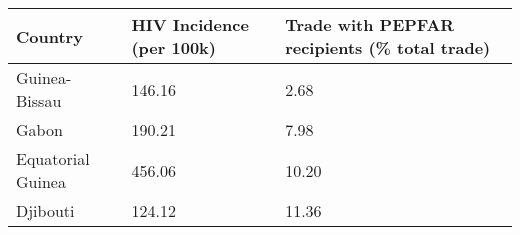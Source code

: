 \begin{table}
\centering
\begin{tabular}[t]{lll}
\toprule
Country & HIV Incidence (per 100k) & Trade with PEPFAR recipients (\% total trade)\\
\midrule
Guinea-Bissau & 146.16 & 2.68\\
Gabon & 190.21 & 7.98\\
Equatorial Guinea & 456.06 & 10.20\\
Djibouti & 124.12 & 11.36\\
\bottomrule
\end{tabular}
\end{table}
